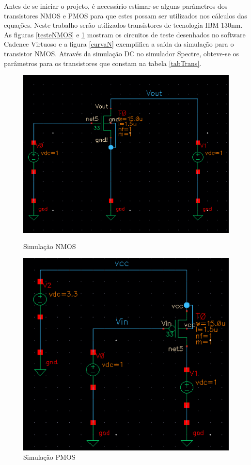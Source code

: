 \documentclass[
	12pt,				%
	oneside,			%
	a4paper,			%
	english,			%
	french,				%
	spanish,			%
	brazil				%
	]{abntex2}
\begin{document}
Antes de se iniciar o projeto, é necessário estimar-se alguns parâmetros dos
transistores NMOS e PMOS para que estes possam ser utilizados nos cálculos das equações. Neste trabalho serão utilizados transistores de tecnologia IBM 130nm. As figuras \ref{testeNMOS} e \ref{testePMOS} mostram os circuitos de teste desenhados no software Cadence Virtuoso e a figura \ref{curvaN} exemplifica a saída da simulação para o transistor NMOS. Através da simulação DC no simulador Spectre, obteve-se os parâmetros para os transistores que constam na tabela \ref{tabTrans}.

\begin{figure}[H]
\centering
\begin{minipage}{.5\textwidth}
  \centering
  \includegraphics[width=.8\linewidth]{nmos.PNG}
  \caption{Simulação NMOS}
  \label{testeNMOS}
\end{minipage}%
\begin{minipage}{.5\textwidth}
  \centering
  \includegraphics[width=.68\linewidth]{pmos.PNG}
  \caption{Simulação PMOS}
  \label{testePMOS}
\end{minipage}
\end{figure}
\end{document}
